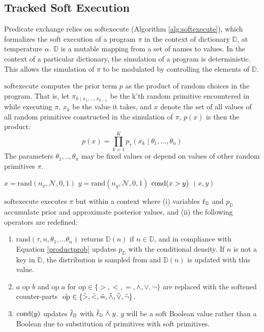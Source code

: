 \subsection{Tracked Soft Execution}
Predicate exchange relies on $\textrm{softexecute}$
(Algorithm \ref{alg:softexecute}), which formalizes the soft execution of a program $\pi$ in the context of dictionary $\mathbb{D}$, at temperature $\alpha$.
$\mathbb{D}$ is a mutable mapping from a set of names to values.
In the context of a particular dictionary, the simulation of a program is deterministic.
This allows the simulation of $\pi$ to be modulated by controlling the elements of $\mathbb{D}$.


$\textrm{softexecute}$ computes the prior term $p$ as the product of random choices in the program. 
That is, let $\pi_{k \mid x_1, ..., x_{k-1}}$ be the k'th random primitive encountered in while executing $\pi$, $x_k$ be the value it takes, and $x$ denote the set of all values of all random primitives constructed in the simulation of $\pi$, $p(x)$ is then the product:
\begin{equation}\label{productprob}
p(x) = \prod_{k=1}^K p_\tau(x_k \mid \theta_1,..., \theta_n )
\end{equation}
The parameters $\theta_1,..,\theta_n$ may be fixed values or depend on values of other random primitives $\pi$.

\begin{exprogram}[tb]
\caption{}
\label{prog:ex1}
\begin{algorithmic}
\STATE $x = \textrm{rand}(n_x, \mathcal{N}, 0, 1)$
\STATE $y = \textrm{rand}(n_y, \mathcal{N}, 0, 1)$
\STATE $\operatorname{cond}(x > y)$
 $(x, y)$
\end{algorithmic}
\end{exprogram}



$\textrm{softexecute}$ executes $\pi$ but within a context where (i) variables $\operatorname{\ell}_\mathbb{D}$ and $p_\mathbb{D}$ accumulate prior and approximate posterior values, and (ii) the following operators are redefined:

\begin{enumerate}
  \item $\textrm{rand}(\tau, n, \theta_1, ...\theta_n)$ returns $\mathbb{D}(n)$ if $n \in \mathbb{D}$, and in compliance with Equation \ref{productprob} updates $p_\mathbb{D}$ with the conditional density. If $n$ is not a key in $\mathbb{D}$, the distribution is sampled from and $\mathbb{D}(n)$ is updated with this value.  
  \item $a \text{ op } b$ and $\textrm{op } a$ for $\textrm{op} \in \{>, <, =, \land, \lor, \neg\}$ are replaced with the softened counter-parts $\mathrel{\tilde{\textrm{ op }}} \in \{\mathrel{\tilde{>}}, \mathrel{\tilde{<}}, \mathrel{\tilde{=}}, \mathrel{\tilde{\land}}, \mathrel{\tilde{\lor}}, \mathrel{\tilde{\neg}}\}$.
  \item $\operatorname{cond}(y)$ updates $\tilde{\operatorname{\ell}}_\mathbb{D}$ with $\tilde{\operatorname{\ell}}_\mathbb{D} \mathrel{\tilde{\land}} y$. $y$ will be a soft Boolean value rather than a Boolean due to substitution of primitives with soft primitives.  
\end{enumerate}

